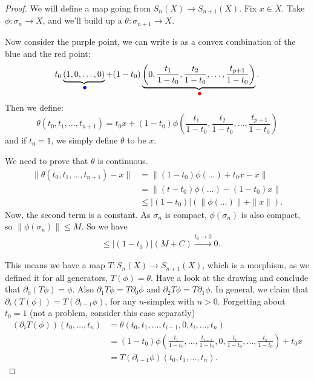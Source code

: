 \begin{proof}
    We will define a map going from $S_n(X) \to S_{n+1}(X)$.
    Fix $x \in X$.
    Take $\phi: \sigma_n \to  X$, and we'll build up a $\theta: \sigma_{n+1} \to  X$.

    Now consider the purple point, we can write is as a convex combination of the blue and the red point:
    \[
        t_0 \underbrace{(1, 0, \ldots, 0)}_{\tikz \fill[blue] circle(2pt);} + (1-t_0) \underbrace{\left( 0,
            \frac{t_1}{1-t_0},
            \frac{t_2}{1-t_0},
            \ldots,
            \frac{t_{p+1}}{1-t_0}
        \right)}_{\tikz \fill[red] circle(2pt);}
    .\] 
    Then we define:
    \[
        \theta(t_0, t_1, \ldots, t_{n+1}) = t_0 x  + (1-t_0) \phi\left(
        \frac{t_1}{1-t_0},
        \frac{t_2}{1-t_0},
        \ldots,
        \frac{t_{p+1}}{1-t_0}\right)
    \] 
    and if $t_0 = 1$, we simply define $\theta$ to be $x$.

    We need to prove that $\theta$ is continuous.
    \begin{align*}
        \|\theta(t_0, t_1, \ldots, t_{n+1}) - x\| &= 
        \|(1-t_0)\phi(\ldots) + t_0 x - x\|\\
                                                  &= \|(t-t_0) \phi(\ldots) - (1-t_0) x\|\\
                                                  &\le  |(1-t_0)| (\|\phi(\ldots)\| + \|x\|)
    .\end{align*}
    Now, the second term is a constant.
    As $\sigma_n$ is compact, $\phi(\sigma_n)$ is also compact, so  $\|\phi(\sigma_n)\| \le  M$.
    So we have
    \begin{align*}
        & \le  |(1-t_0)| (M + C) \xrightarrow{t_0 \to 0} 0
    .\end{align*}
\begin{figure}[H]
    \centering
    \label{fig:homology-of-convex-subset-of-rn}
\end{figure}

This means we have a map $T: S_n(X) \to  S_{n+1}(X)$, which is a morphism, as we defined it for all generators, $T(\phi) = \theta$.
Have a look at the drawing and conclude that $\partial_0(T\phi) = \phi$.
Also $\partial_1 T\phi = T \partial_0 \phi$ and $\partial_2 T \phi = T \partial_1 \phi$.
In general, we claim that $\partial_i (T(\phi)) = T(\partial_{i-1} \phi)$, for any $n$-simplex with $n>0$. Forgetting about $t_0 = 1$ (not a problem, consider this case separatly)
\begin{align*}
    (\partial_i T(\phi))(t_0, \ldots, t_n) &= \theta(t_0, t_1, \ldots, t_{i-1}, 0, t_i, \ldots, t_n)\\
                                           &= (1-t_0) \phi\left(\frac{t_1}{1-t_0}, \ldots, \frac{t_{i-1}}{1-t_0}, 0, \frac{t_i}{1-t_0}, \ldots, \frac{t_n}{1-t_0}\right) + t_0 x\\
                                           &= T(\partial_{i-1} \phi)(t_0, t_1, \ldots, t_n)
.\end{align*}


\end{proof}

